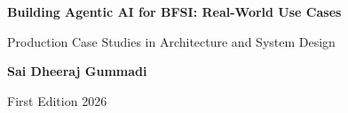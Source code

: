 \begin{titlepage}
\centering
\vspace*{2cm}
{\Huge\bfseries Building Agentic AI for BFSI: Real-World Use Cases\par}
\vspace{0.8cm}
{\Large Production Case Studies in Architecture and System Design\par}
\vspace{1.5cm}
{\large\bfseries Sai Dheeraj Gummadi\par}
\vspace{0.5cm}
{\large First Edition \textperiodcentered{} 2026\par}
\vfill
\end{titlepage}
